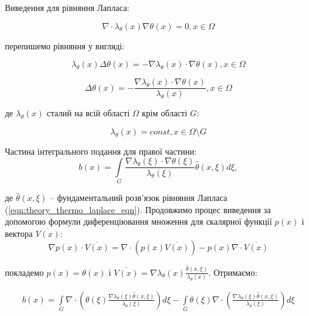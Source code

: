 Виведення для рівняння Лапласа:

\begin{equation}
    \label{eqn:theory_thermo_laplace_eqn}
    \nabla \cdot \lambda_\theta(x) \nabla \theta(x) = 0, x \in \Omega
\end{equation}

перепишемо рівняння у вигляді:

\begin{equation}
    \lambda_\theta(x) \Delta \theta(x) = - \nabla \lambda_\theta(x) \cdot \nabla \theta(x), x \in \Omega
\end{equation}

\begin{equation}
    \Delta \theta(x) = - \frac{\nabla \lambda_\theta(x) \cdot \nabla \theta(x)}{\lambda_\theta(x)}, x \in \Omega
\end{equation}

\noindent де $\lambda_\theta(x)$ сталий на всій області $\Omega$ крім області $G$: 

\begin{equation}
    \lambda_\theta(x) = const, x \in \Omega \setminus G
\end{equation}

Частина інтегрального подання для правої частини:
\begin{equation}
    b(x) = \int \limits_{G} \frac{\nabla \lambda_\theta(\xi) \cdot \nabla \theta(\xi)}{\lambda_\theta(\xi)} 
        \hat{\theta}(x,\xi) d \xi,
\end{equation}

\noindent де $\hat{\theta}(x, \xi)$ -- фундаментальний розв'язок рівняння Лапласа (\ref{eqn:theory_thermo_laplace_eqn}). 
Продовжимо процес виведення за допомогою формули диференціювання множення для скалярної функції $p(x)$ і вектора 
$\overline{V(x)}$:
\begin{equation}
    \label{eqn:theory_vector_differentiation}
    \nabla p(x) \cdot \overline{V(x)} = \nabla \cdot (p(x)\overline{V(x)}) - p(x) \nabla \cdot \overline{V(x)}
\end{equation}

\noindent покладемо $p(x) = \theta(x)$ і 
$\overline{V(x)} = \nabla \lambda_{\theta}(x) \frac{\hat{\theta}(x, \xi)}{\lambda_{\theta}(x)}$. Отримаємо:

\begin{equation}
    \begin{split}
        b(x) =  \int \limits_{G} \nabla \cdot 
            \left( \theta(\xi) \frac{\nabla \lambda_\theta(\xi) \hat{\theta}(x, \xi)}{\lambda_\theta(\xi)} \right) d \xi 
            -
            \int \limits_{G} \theta(\xi) \nabla \cdot  
                \left( \frac{\nabla \lambda_\theta(\xi) \hat{\theta}(x, \xi)}{\lambda_\theta(\xi)} \right) d \xi 
    \end{split}
\end{equation}


